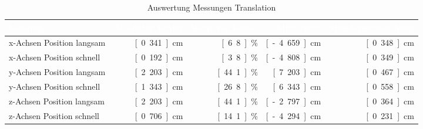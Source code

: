 \begin{table}[htbp]
     \centering
     \caption{Auswertung Messungen Translation}
     \label{tab:auswertung_tran}
     \begin{tabularx}{\textwidth}{|X|r|r|r|r|} 
		\hline
		\rowcolor{bfhblue}
		\textcolor{white}{Messung} & \textcolor{white}{Absoluter Fehler} & \textcolor{white}{Relativer Fehler} & \textcolor{white}{Mittelwert}  & \textcolor{white}{Standardabweichung}\\
		\hline
		x-Achsen Position langsam & \unit[0.341]{cm} & \unit[6.8]{\%} & \unit[-4.659]{cm} & \unit[0.348]{cm}\\
		\hline
		x-Achsen Position schnell & \unit[0.192]{cm} & \unit[3.8]{\%} & \unit[-4.808]{cm} & \unit[0.349]{cm} \\
		\hline
		y-Achsen Position langsam & \unit[2.203]{cm} & \unit[44.1]{\%} & \unit[7.203]{cm} & \unit[0.467]{cm}\\
		\hline
		y-Achsen Position schnell & \unit[1.343]{cm} & \unit[26.8]{\%} & \unit[6.343]{cm} & \unit[0.558]{cm} \\
		\hline
		z-Achsen Position langsam & \unit[2.203]{cm} & \unit[44.1]{\%} & \unit[-2.797]{cm} & \unit[0.364]{cm} \\
		\hline
		z-Achsen Position schnell & \unit[0.706]{cm} & \unit[14.1]{\%} & \unit[-4.294]{cm} & \unit[0.231]{cm}\\
		\hline
     \end{tabularx}  
\end{table}